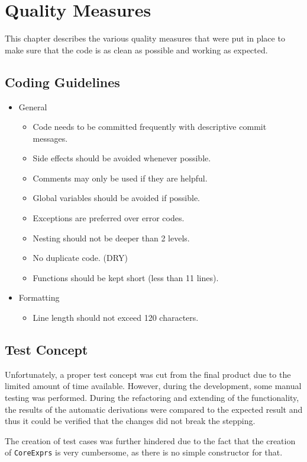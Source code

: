 \chapter{Quality Measures}

This chapter describes the various quality measures that were put in place to make sure that the code is as clean as possible and working as expected.

\section{Coding Guidelines}

\begin{itemize}
    \item General
    \begin{itemize}
        \item Code needs to be committed frequently with descriptive commit messages.
        \item Side effects should be avoided whenever possible.
        \item Comments may only be used if they are helpful.
        \item Global variables should be avoided if possible.
        \item Exceptions are preferred over error codes.
        \item Nesting should not be deeper than 2 levels.
        \item No duplicate code. (DRY)
        \item Functions should be kept short (less than 11 lines).
    \end{itemize}
    \item Formatting
    \begin{itemize}
        \item Line length should not exceed 120 characters.
    \end{itemize}
\end{itemize}

\section{Test Concept}

Unfortunately, a proper test concept was cut from the final product due to the limited amount of time available.
However, during the development, some manual testing was performed.
During the refactoring and extending of the functionality,
the results of the automatic derivations were compared to the expected result and thus it could be verified that the changes did not break the stepping.

The creation of test cases was further hindered due to the fact that the creation of \texttt{CoreExprs} is very cumbersome,
as there is no simple constructor for that.

